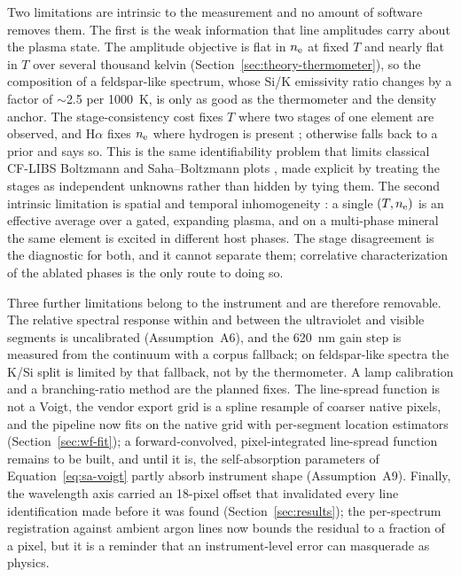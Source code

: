 Two limitations are intrinsic to the measurement and no amount of software removes
them. The first is the weak information that line amplitudes carry about the plasma
state. The amplitude objective is flat in $n_{\mathrm{e}}$ at fixed $T$ and nearly flat in $T$
over several thousand kelvin (Section~\ref{sec:theory-thermometer}), so the
composition of a feldspar-like spectrum, whose Si/K emissivity ratio changes by a
factor of $\sim$2.5 per \SI{1000}{\kelvin}, is only as good as the thermometer and
the density anchor. The stage-consistency cost fixes $T$ where two stages of one
element are observed, and H$\alpha$ fixes $n_{\mathrm{e}}$ where hydrogen is present
\citep{gigosos2003halpha}; otherwise \alibz{} falls back to a prior and says so. This
is the same identifiability problem that limits classical CF-LIBS Boltzmann and
Saha--Boltzmann plots \citep{tognoni2010cflibs,aguilera2007multielement}, made
explicit by treating the stages as independent unknowns rather than hidden by tying
them. The second intrinsic limitation is spatial and temporal inhomogeneity
\citep{aragon2008review,cristoforetti2013columnar}: a single $(T,n_{\mathrm{e}})$ is an
effective average over a gated, expanding plasma, and on a multi-phase mineral the
same element is excited in different host phases. The stage disagreement is the
diagnostic for both, and it cannot separate them; correlative characterization of the
ablated phases is the only route to doing so.

Three further limitations belong to the instrument and are therefore removable. The
relative spectral response within and between the ultraviolet and visible segments is
uncalibrated (Assumption~A6), and the \SI{620}{\nano\meter} gain step is measured
from the continuum with a corpus fallback; on feldspar-like spectra the K/Si split is
limited by that fallback, not by the thermometer. A lamp calibration and a
branching-ratio method \citep{li2014spectralresponse,urbinamedina2021branching} are
the planned fixes. The line-spread function is not a Voigt, the vendor export grid is
a spline resample of coarser native pixels, and the pipeline now fits on the native
grid with per-segment location estimators (Section~\ref{sec:wf-fit}); a
forward-convolved, pixel-integrated line-spread function remains to be built, and
until it is, the self-absorption parameters of Equation~\eqref{eq:sa-voigt} partly
absorb instrument shape (Assumption~A9). Finally, the wavelength axis carried an
18-pixel offset that invalidated every line identification made before it was found
(Section~\ref{sec:results}); the per-spectrum registration against ambient argon
lines now bounds the residual to a fraction of a pixel, but it is a reminder that an
instrument-level error can masquerade as physics.

